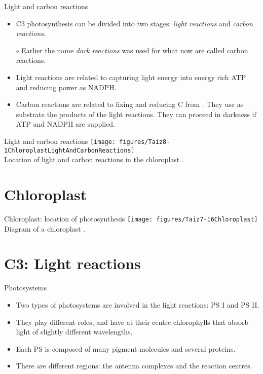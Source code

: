 \documentclass[10pt]{beamer}
\begin{document}
\begin{frame}{Light and carbon reactions}
    \begin{itemize}
        \item C3 photosynthesis can be divided into two stages:
        \emph{light reactions} and \emph{carbon reactions}.
        \item[$\circ$] Earlier the name \emph{dark reactions} was
        used for what now are called carbon reactions.
        \item Light reactions are related to capturing light energy
        into energy rich ATP and reducing power as NADPH.
        \item Carbon reactions are related to fixing and reducing C
        from \COtwo. They use as substrate the products of the light
        reactions. They can proceed in darkness if ATP and NADPH are
        supplied.
    \end{itemize}
\end{frame}

\begin{frame}{Light and carbon reactions}
    \centering
    \texttt{[image: figures/Taiz8-1ChloroplastLightAndCarbonReactions]}\\
    {\small Location of light and carbon reactions in the chloroplast \autocite[from][]{TaiZei2006}.}
\end{frame}

\section{Chloroplast}

\begin{frame}{Chloroplast: location of photosynthesis}
    \centering
    \texttt{[image: figures/Taiz7-16Chloroplast]}\\
    {\small Diagram of a chloroplast \autocite[from][]{TaiZei2006}.}
\end{frame}

\section{C3: Light reactions}

\begin{frame}{Photosystems}
    \begin{itemize}
        \item Two types of photosystems are involved in the light
        reactions: PS I and PS II.
        \item They play different roles, and have at their centre
        chlorophylls that absorb light of slightly different
        wavelengths.
        \item Each PS is composed of many pigment molecules and
        several proteins.
        \item There are different regions: the antenna complexes
        and the reaction centres.
    \end{itemize}
\end{frame}
\end{document}
